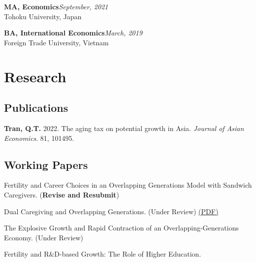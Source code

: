 \documentclass[12pt]{article}
\begin{document}
\textbf{MA, Economics}\hfill\emph{September, 2021}\\
Tohoku University, Japan

\textbf{BA, International Economics}\hfill\emph{March, 2019}\\
Foreign Trade University, Vietnam


\section{Research}

\subsection{Publications}

\begin{enumerate}[label={[\arabic*]}]

\item \textbf{Tran, Q.T.} 2022. The aging tax on potential growth in Asia. \textit{Journal of Asian Economics}. 81, 101495. 
\end{enumerate}

\subsection{Working Papers}

\begin{enumerate}[label={[\arabic*]}]

\item Fertility and Career Choices in an Overlapping Generations Model with Sandwich Caregivers. (\textbf{Revise and Resubmit})

\item Dual Caregiving and Overlapping Generations. (Under Review) \href{https://ideas.repec.org/p/toh/tupdaa/64.html}{(PDF)}

\item The Explosive Growth and Rapid Contraction of an Overlapping-Generations Economy. (Under Review)

\item Fertility and R\&D-based Growth: The Role of Higher Education. 

\end{enumerate}
\end{document}
